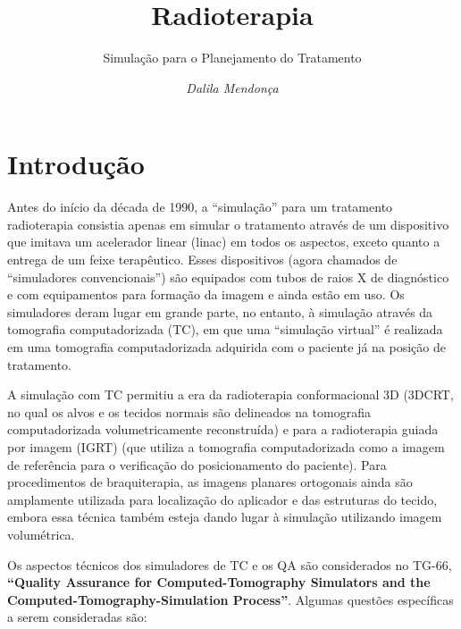 \documentclass[11pt,a4paper]{article}
\title{\LobsterTwo\Huge{Radioterapia}}
\author{\LobsterTwo\Large{Simulação para o Planejamento do Tratamento}\nocite{*}}
\date{\LobsterTwo\textit{Dalila Mendonça}}
\begin{document}
	\maketitle

\section{Introdução}

	Antes do início da década de 1990, a “simulação” para um tratamento radioterapia consistia apenas em simular o tratamento através de um dispositivo que imitava um acelerador linear (linac) em todos os aspectos, exceto quanto a entrega de um feixe terapêutico. Esses dispositivos (agora chamados de “simuladores convencionais”) são equipados com tubos de raios X de diagnóstico e com equipamentos para formação da imagem e ainda estão em uso. Os simuladores deram lugar em grande parte, no entanto, à simulação através da tomografia computadorizada (TC), em que uma “simulação virtual” é realizada em uma tomografia computadorizada adquirida com o paciente já na posição de tratamento.
	
	A simulação com TC permitiu a era da radioterapia conformacional 3D (3DCRT, no qual os alvos e os tecidos normais são delineados na tomografia computadorizada volumetricamente reconstruída) e para a radioterapia guiada por imagem (IGRT) (que utiliza a tomografia computadorizada como a imagem de referência para o verificação do posicionamento do paciente). Para procedimentos de braquiterapia, as imagens planares ortogonais ainda são amplamente utilizada para localização do aplicador e das estruturas do tecido, embora essa técnica também esteja dando lugar à simulação utilizando imagem volumétrica.

	Os aspectos técnicos dos simuladores de TC e os QA são considerados no TG-66, \textbf{``Quality Assurance for Computed-Tomography Simulators and the Computed-Tomography-Simulation Process''}. Algumas questões específicas a serem consideradas são:
\end{document}
